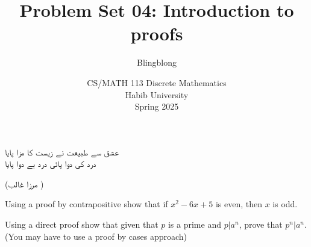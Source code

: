 \documentclass[a4paper]{exam}
\title{Problem Set 04: Introduction to proofs}
\author{Blingblong} %
\date{CS/MATH 113 Discrete Mathematics\\Habib University\\Spring 2025}
\begin{document}
\maketitle

\begin{center}
    \texturdu{عشق سے طبیعت نے زیست کا مزا پایا}
    \\\texturdu{درد کی دوا پائی درد بے دوا پایا}
    \begin{flushleft}
        \hspace*{4.5cm} (\texturdu{مرزا غالب })
    \end{flushleft}
\end{center}

\begin{questions}

    \question[5] Using a proof by contrapositive show that if $x^{2} - 6x + 5$ is even, then $x$ is odd.
    \begin{solution}
    \end{solution}

    \question[5] Using a direct proof show that given that $p$ is a prime and $p|a^n$, prove that $p^n|a^n$. (You may have to use a proof by cases approach)
    \begin{solution}
    \end{solution}


    
\end{questions}
\end{document}
